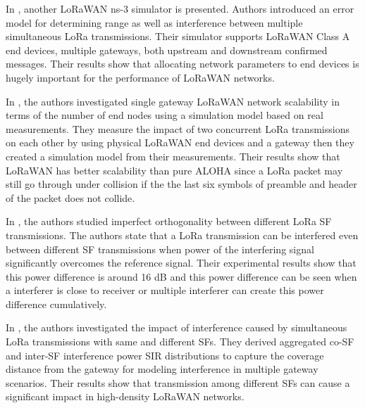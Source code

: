 \documentclass[conference]{IEEEtran}
\begin{document}
\par In \cite{8090518}, another LoRaWAN ns-3 simulator is presented. Authors introduced an error model for determining range as well as interference between multiple simultaneous LoRa transmissions. Their simulator supports LoRaWAN Class A end devices, multiple gateways, both upstream and downstream confirmed messages. Their results show that allocating network parameters to end devices is hugely important for the performance of LoRaWAN networks.

\par In \cite{s17061193}, the authors investigated single gateway LoRaWAN network scalability in terms of the number of end nodes using a simulation model based on real measurements. They measure the impact of two concurrent LoRa transmissions on each other by using physical LoRaWAN end devices and a gateway then they created a simulation model from their measurements. Their results show that LoRaWAN has better scalability than pure ALOHA since a LoRa packet may still go through under collision if the the last six symbols of preamble and header of the packet does not collide.

\par In \cite{8267219}, the authors studied imperfect orthogonality between different LoRa SF transmissions. The authors state that a LoRa transmission can be interfered even between different SF transmissions when power of the interfering signal significantly overcomes the reference signal. Their experimental results show that this power difference is around 16 dB and this power difference can be seen when a interferer is close to receiver or multiple interferer can create this power difference cumulatively.

\par In \cite{8430542}, the authors investigated the impact of interference caused by simultaneous LoRa transmissions with same and different SFs. They derived aggregated co-SF and inter-SF interference power SIR distributions to capture the coverage  distance from the gateway for modeling interference in multiple gateway scenarios. Their results show that transmission among different SFs can cause a significant impact in high-density LoRaWAN networks.
\end{document}
